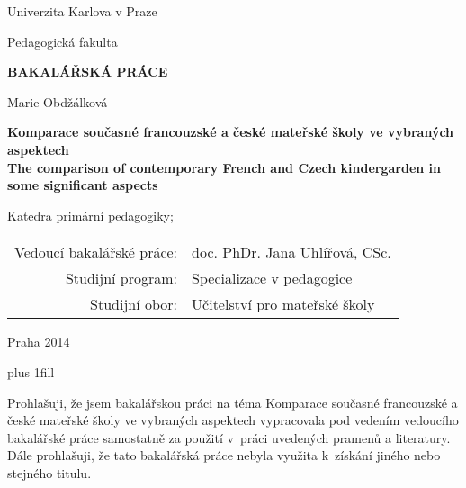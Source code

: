 \documentclass[12pt,a4paper,singleside,openright]{report}
\newcommand{\mujNazevPrace}{Komparace současné francouzské a české mateřské školy ve vybraných aspektech}
\newcommand{\mujNazevPraceAJ}{The comparison of contemporary French and Czech kindergarden in some significant aspects}
\newcommand{\mujVedouci}{doc. PhDr. Jana Uhlířová, CSc.}
\newcommand{\mujKatedra}{Katedra primární pedagogiky}
\newcommand{\mujProgram}{Specializace v pedagogice}
\newcommand{\mujObor}{Učitelství pro mateřské školy}
\begin{document}


\pagestyle{empty}
\begin{center}

\large

Univerzita Karlova v Praze

\medskip

Pedagogická fakulta

\vfill

{\bf\Large BAKALÁŘSKÁ PRÁCE}

\vfill


\vfill
\vspace{5mm}

{\LARGE Marie Obdžálková}

\vspace{15mm}

{\LARGE\bfseries
	\mujNazevPrace
\large\bfseries \\
\vspace{8mm}
	\mujNazevPraceAJ
}

\vfill

\mujKatedra;

\vfill

\begin{tabular}{rl}

Vedoucí bakalářské práce: & \mujVedouci \\
\noalign{\vspace{2mm}}
Studijní program: & \mujProgram \\
\noalign{\vspace{2mm}}
Studijní obor: & \mujObor \\
\end{tabular}

\vfill

Praha 2014

\end{center}

\newpage

	\vglue 0pt plus 1fill

	\noindent
	Prohlašuji, že jsem bakalářskou práci na téma Komparace současné francouzské a české mateřské školy ve vybraných aspektech vypracovala pod vedením vedoucího bakalářské práce samostatně za použití v práci uvedených pramenů a literatury. Dále prohlašuji, že tato bakalářská práce nebyla využita k získání jiného nebo stejného titulu.
\end{document}
